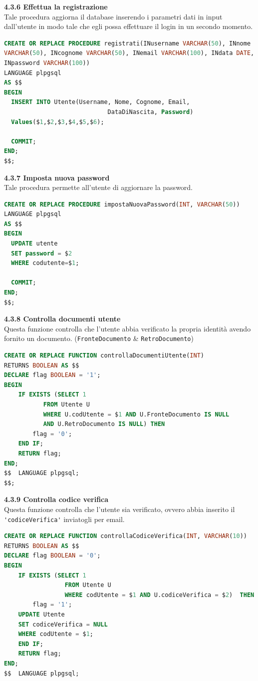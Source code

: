 \documentclass[a4paper,12pt]{article}
\begin{document}
\vspace*{+1cm}

{\flushleft \bf 4.3.6  Effettua la registrazione}\\
Tale procedura aggiorna il database inserendo i parametri dati in input dall'utente in
modo tale che egli possa effettuare il login in un secondo momento.
\begin{lstlisting}[language=SQL]
CREATE OR REPLACE PROCEDURE registrati(INusername VARCHAR(50), INnome 
VARCHAR(50), INcognome VARCHAR(50), INemail VARCHAR(100), INdata DATE, 
INpassword VARCHAR(100))
LANGUAGE plpgsql
AS $$
BEGIN
  INSERT INTO Utente(Username, Nome, Cognome, Email, 
  					         DataDiNascita, Password)
  Values($1,$2,$3,$4,$5,$6);

  COMMIT;
END;
$$;
\end{lstlisting}
\newpage

\newpage\null{}\setcounter{page}{21}
\vspace{-2cm}
{\flushleft \bf 4.3.7  Imposta nuova password}\\
Tale procedura permette all'utente di aggiornare la password.
\begin{lstlisting}[language=SQL]
CREATE OR REPLACE PROCEDURE impostaNuovaPassword(INT, VARCHAR(50))
LANGUAGE plpgsql
AS $$
BEGIN
  UPDATE utente
  SET password = $2
  WHERE codutente=$1;

  COMMIT;
END;
$$;
\end{lstlisting}

\vspace*{+1cm}

{\flushleft \bf 4.3.8  Controlla documenti utente}\\
Questa funzione controlla che l'utente abbia verificato la propria identità avendo
fornito un documento. (\verb|FronteDocumento| \& \verb|RetroDocumento|)
\begin{lstlisting}[language=SQL]
CREATE OR REPLACE FUNCTION controllaDocumentiUtente(INT)
RETURNS BOOLEAN AS $$
DECLARE flag BOOLEAN = '1';
BEGIN
	IF EXISTS (SELECT 1
		   FROM Utente U
		   WHERE U.codUtente = $1 AND U.FronteDocumento IS NULL 
		   AND U.RetroDocumento IS NULL) THEN
		flag = '0';
	END IF;
	RETURN flag;
END;
$$  LANGUAGE plpgsql;
$$;
\end{lstlisting}

\vspace*{+1cm}

{\flushleft \bf 4.3.9  Controlla codice verifica}\\
Questa funzione controlla che l'utente sia verificato, ovvero abbia inserito
il \verb|'codiceVerifica'| inviatogli per email.
\begin{lstlisting}[language=SQL]
CREATE OR REPLACE FUNCTION controllaCodiceVerifica(INT, VARCHAR(10))
RETURNS BOOLEAN AS $$
DECLARE flag BOOLEAN = '0';
BEGIN
	IF EXISTS (SELECT 1
		   	     FROM Utente U
		      	 WHERE codUtente = $1 AND U.codiceVerifica = $2)  THEN
		flag = '1';
    UPDATE Utente 
    SET codiceVerifica = NULL 
    WHERE codUtente = $1;
	END IF;
	RETURN flag;
END;
$$  LANGUAGE plpgsql;
\end{lstlisting}
\newpage
\end{document}

